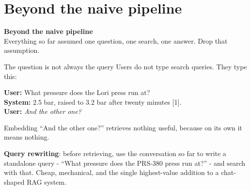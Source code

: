 \documentclass[aspectratio=169]{beamer}
\newcommand{\keybox}[1]{%
  \begin{tcolorbox}[colback=armblue!8, colframe=armblue, boxrule=0.6pt, arc=2pt]
  #1
  \end{tcolorbox}}
\newcommand{\sectiontransition}[2]{%
  \begin{frame}[plain]
    \vfill
    \begin{center}
      {\Huge\bfseries\color{popblue} #1}\\[1.1em]
      {\large #2}
    \end{center}
    \vfill
  \end{frame}}
\begin{document}
\section{Beyond the naive pipeline}
\sectiontransition{Beyond the naive pipeline}{Everything so far assumed one question, one
search, one answer. Drop that assumption.}

\begin{frame}{The question is not always the query}
  \vspace{0.3em}
  Users do not type search queries. They type this:

  \vspace{0.35em}
  \begin{center}
  \begin{tcolorbox}[colback=lightbg, colframe=gray, boxrule=0.5pt, arc=2pt, width=0.9\textwidth]
    \small
    \textbf{User:} What pressure does the Lori press run at?\\
    \textbf{System:} 2.5 bar, raised to 3.2 bar after twenty minutes [1].\\
    \textbf{User:} \textit{And the other one?}
  \end{tcolorbox}
  \end{center}

  \vspace{0.4em}
  Embedding ``And the other one?'' retrieves nothing useful, because on its own it means
  nothing.

  \vspace{0.4em}
  \keybox{\textbf{Query rewriting}: before retrieving, use the conversation so far to write
  a standalone query - ``What pressure does the PRS-380 press run at?'' - and search with
  that. Cheap, mechanical, and the single highest-value addition to a chat-shaped RAG
  system.}
\end{frame}
\end{document}
